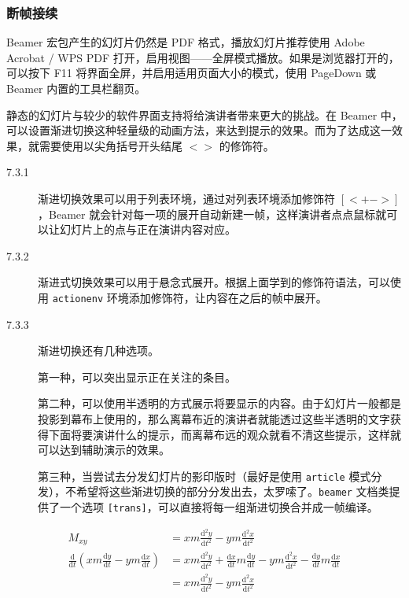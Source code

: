 \documentclass{beamer}
\begin{document}
\begin{CJK}{UTF8}{hei}

    \begin{frame}[allowframebreaks]
        \frametitle{断帧接续}
        Beamer 宏包产生的幻灯片仍然是 PDF 格式，播放幻灯片推荐使用 Adobe Acrobat / WPS PDF 打开，启用视图——全屏模式播放。如果是浏览器打开的，可以按下 F11 将界面全屏，并启用适用页面大小的模式，使用 PageDown 或 Beamer 内置的工具栏翻页。

        静态的幻灯片与较少的软件界面支持将给演讲者带来更大的挑战。在 Beamer 中，可以设置渐进切换这种轻量级的动画方法，来达到提示的效果。而为了达成这一效果，就需要使用以尖角括号开头结尾 $<>$ 的修饰符。

        \begin{description}
            \item[7.3.1] 渐进切换效果可以用于列表环境，通过对列表环境添加修饰符 $[<+->]$，Beamer 就会针对每一项的展开自动新建一帧，这样演讲者点点鼠标就可以让幻灯片上的点与正在演讲内容对应。
            \item[7.3.2] 渐进式切换效果可以用于悬念式展开。根据上面学到的修饰符语法，可以使用 \texttt{actionenv} 环境添加修饰符，让内容在之后的帧中展开。
            \item[7.3.3]  渐进切换还有几种选项。
            
            第一种，可以突出显示正在关注的条目。

            第二种，可以使用半透明的方式展示将要显示的内容。由于幻灯片一般都是投影到幕布上使用的，那么离幕布近的演讲者就能透过这些半透明的文字获得下面将要演讲什么的提示，而离幕布远的观众就看不清这些提示，这样就可以达到辅助演示的效果。

            第三种，当尝试去分发幻灯片的影印版时（最好是使用 \texttt{article} 模式分发），不希望将这些渐进切换的部分分发出去，太罗嗦了。\texttt{beamer} 文档类提供了一个选项 \texttt{[trans]}，可以直接将每一组渐进切换合并成一帧编译。
        \end{description}
        
    \end{frame}

    \begin{frame}[allowdisplaybreaks]
        \begin{align*}
            M_{xy}&=xm\frac{\textrm{d}^2 y}{\textrm{d}t^2}-ym\frac{\textrm{d}^2 x}{\textrm{d}t^2}\\
            \frac{\textrm{d}}{\textrm{d}t}\left(xm\frac{\textrm{d}y}{\textrm{d}t}-ym\frac{\textrm{d}x}{\textrm{d}t}\right)&=xm\frac{\textrm{d}^2 y}{\textrm{d}t^2}+\frac{\textrm{d}x}{\textrm{d}t}m\frac{\textrm{d}y}{\textrm{d}t}-ym\frac{\textrm{d}^2x}{\textrm{d}t^2}-\frac{\textrm{d}y}{\textrm{d}t}m \frac{\textrm{d}x}{\textrm{d}t}\\
            &=xm\frac{\textrm{d}^2 y}{\textrm{d}t^2}-ym\frac{\textrm{d}^2 x}{\textrm{d}t^2}
        \end{align*}
    \end{frame}


\end{CJK}
\end{document}

